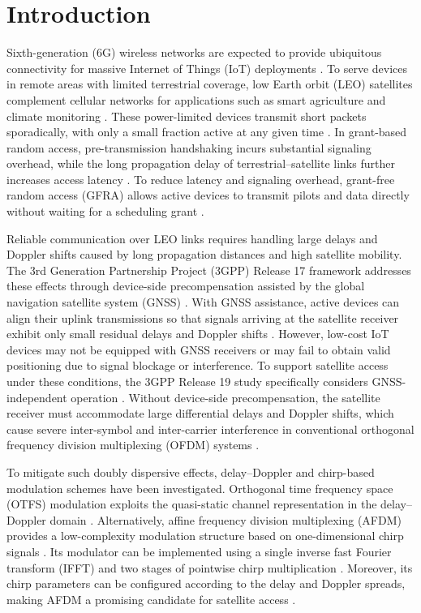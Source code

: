\section{Introduction}
\label{sec:introduction}

Sixth-generation (6G) wireless networks are expected to provide ubiquitous
connectivity for massive Internet of Things (IoT) deployments
\cite{cai2026,xu2026}. To serve devices in remote areas with limited
terrestrial coverage, low Earth orbit (LEO) satellites complement cellular
networks for applications such as smart agriculture and climate monitoring
\cite{shen2025,kodheli2021}. These power-limited devices transmit short
packets sporadically, with only a small fraction active at any given time
\cite{cai2026,shen2025,mei2022}. In grant-based random access,
pre-transmission handshaking incurs substantial signaling overhead, while the
long propagation delay of terrestrial--satellite links further increases
access latency \cite{cai2026,xu2026}. To reduce latency and signaling
overhead, grant-free random access (GFRA) allows active devices to transmit
pilots and data directly without waiting for a scheduling grant
\cite{cai2026,xu2026}.

Reliable communication over LEO links requires handling large delays and
Doppler shifts caused by long propagation distances and high satellite
mobility. The 3rd Generation Partnership Project (3GPP) Release 17 framework
addresses these effects through device-side precompensation assisted by the
global navigation satellite system (GNSS) \cite{3gpp38300}. With GNSS
assistance, active devices can align their uplink transmissions so that
signals arriving at the satellite receiver exhibit only small residual delays
and Doppler shifts \cite{shen2025,li2023}. However, low-cost IoT devices may
not be equipped with GNSS receivers or may fail to obtain valid positioning
due to signal blockage or interference. To support satellite access under
these conditions, the 3GPP Release 19 study specifically considers
GNSS-independent operation \cite{3gpp22865}. Without device-side
precompensation, the satellite receiver must accommodate large differential
delays and Doppler shifts, which cause severe inter-symbol and inter-carrier
interference in conventional orthogonal frequency division multiplexing (OFDM)
systems \cite{shen2025,huang2026}.

To mitigate such doubly dispersive effects, delay--Doppler and chirp-based
modulation schemes have been investigated. Orthogonal time frequency space
(OTFS) modulation exploits the quasi-static channel representation in the
delay--Doppler domain \cite{shen2025,hadani2017}. Alternatively, affine
frequency division multiplexing (AFDM) provides a low-complexity modulation
structure based on one-dimensional chirp signals \cite{huang2026,ding2026}.
Its modulator can be implemented using a single inverse fast Fourier transform
(IFFT) and two stages of pointwise chirp multiplication \cite{bemani2022}.
Moreover, its chirp parameters can be configured according to the delay and
Doppler spreads, making AFDM a promising candidate for satellite access
\cite{bemani2022}.

